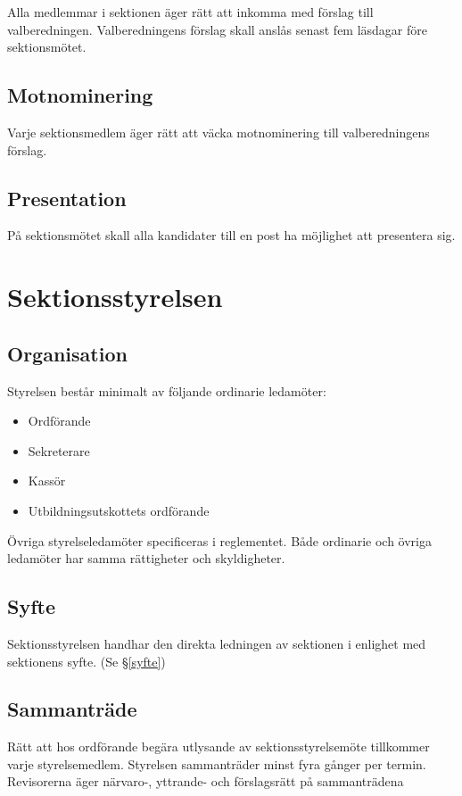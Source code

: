 \documentclass{datateknologsektionen-document}
\begin{document}
      Alla medlemmar i sektionen äger rätt att inkomma med förslag till valberedningen.
      Valberedningens förslag skall anslås senast fem läsdagar före sektionsmötet.
    \subsection{Motnominering}
      Varje sektionsmedlem äger rätt att väcka motnominering till valberedningens förslag.
    \subsection{Presentation}
      På sektionsmötet skall alla kandidater till en post ha möjlighet att presentera sig.
  \section{Sektionsstyrelsen}
    \subsection{Organisation}
      Styrelsen består minimalt av följande ordinarie ledamöter:
      \begin{itemize}
        \item Ordförande
        \item Sekreterare
        \item Kassör
        \item Utbildningsutskottets ordförande
      \end{itemize}
      Övriga styrelseledamöter specificeras i reglementet. Både ordinarie och övriga ledamöter
      har samma rättigheter och skyldigheter.
    \subsection{Syfte}
      Sektionsstyrelsen handhar den direkta ledningen av sektionen i enlighet med sektionens
      syfte. (Se \S \ref{syfte})
    \subsection{Sammanträde}
      \label{sektionsstyrelsensammantrade}
      Rätt att hos ordförande begära utlysande av sektionsstyrelsemöte tillkommer varje
      styrelsemedlem. Styrelsen sammanträder minst fyra gånger per termin. Revisorerna äger
      närvaro-, yttrande- och förslagsrätt på sammanträdena
\end{document}
